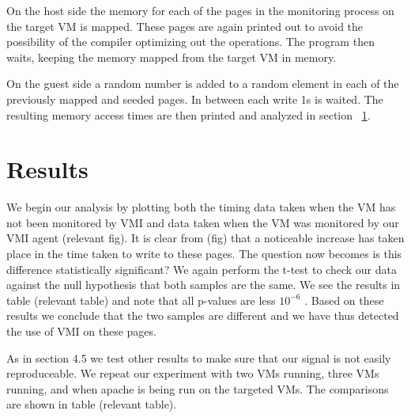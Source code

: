 On the host side the memory for each of the pages in the monitoring process on the target VM is mapped. These pages are again printed out to avoid the possibility of the compiler optimizing out the operations. The program then waits, keeping the memory mapped from the target VM in memory. 

On the guest side a random number is added to a random element in each of the previously mapped and seeded pages. In between each write 1s is waited. The resulting memory access times are then printed and analyzed in section ~\ref{PageMergeChap-Res}.

\section{Results}\label{PageMergeChap-Res}
We begin our analysis by plotting both the timing data taken when the VM has not been monitored by VMI and data taken when the VM was monitored by our VMI agent (relevant fig). It is clear from (fig) that a noticeable increase has taken place in the time taken to write to these pages. The question now becomes is this difference statistically significant? We again perform the t-test to check our data against the null hypothesis that both samples are the same. We see the results in table (relevant table) and note that all p-values are less  $10^{-6}$ . Based on these results we conclude that the two samples are different and we have thus detected the use of VMI on these pages.

As in section 4.5 we test other results to make sure that our signal is not easily reproduceable. We repeat our experiment with two VMs running, three VMs running, and when apache is being run on the targeted VMs. The comparisons are shown in table (relevant table). 

